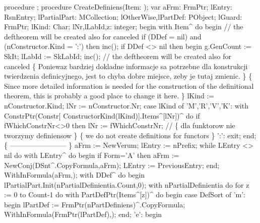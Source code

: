 procedure ;
   procedure CreateDefiniens(Item: );
   var
      aFrm: FrmPtr;
      lEntry: RsnEntry;
      lPartialPart: MCollection;
      lOtherWise,lPartDef: PObject;
      lGuard: FrmPtr;
      lKind: Char;
      lNr,lLabId,z: integer;
   begin
      with Item^ do
      begin
         // the deftheorem will be created also for canceled
         if (DDef = nil) and (nConstructor.Kind = ':') then inc();
         if DDef <> nil then
         begin
            g.GenCount := SkIt; lLabId := SkLabId;
            inc();  // the deftheorem will be created also for canceled
            \{ Poniewaz bardziej dokladne informacje sa potrzebne dla
              konstrukcji twierdzenia definicyjnego, jest to chyba dobre
              miejsce, zeby je tutaj zmienic. \}
            \{ Since more detailed information is needed for
              the construction of the definitional theorem, this is probably a good
              place to change it here. \}
            lKind := nConstructor.Kind;
            lNr := nConstructor.Nr;
            case lKind of
               'M','R','V','K':
                  with ConstrPtr(Constr[ ConstructorKind(lKind)].Items^[lNr])^ do
                              if fWhichConstrNr<>0 then lNr := fWhichConstrNr;
               //        \{ dla funktorow nie tworzymy definiensow \}
                         \{ we do not create definitions for functors \}
               ':': exit;
            end;
            \{ ------------------------ \}
            aFrm := NewVerum; lEntry := nPrefix;
            while LEntry <> nil do with LEntry^ do
            begin
               if Form='A' then aFrm := NewConj(DSnt^.CopyFormula,aFrm);
               LEntry := PreviousEntry;
            end;
            WithInFormula(aFrm,);
            with DDef^ do
            begin lPartialPart.Init(nPartialDefinientia.Count,0);
            with nPartialDefinientia do
               for z := 0 to Count-1 do
                  with PartDefPtr(Items^[z])^ do
               begin
                  case DefSort of
                     'm':
                        begin
                           lPartDef := FrmPtr(nPartDefiniens)^.CopyFormula;
                           WithInFormula(FrmPtr(lPartDef),);
                        end;
                     'e':
                        begin
